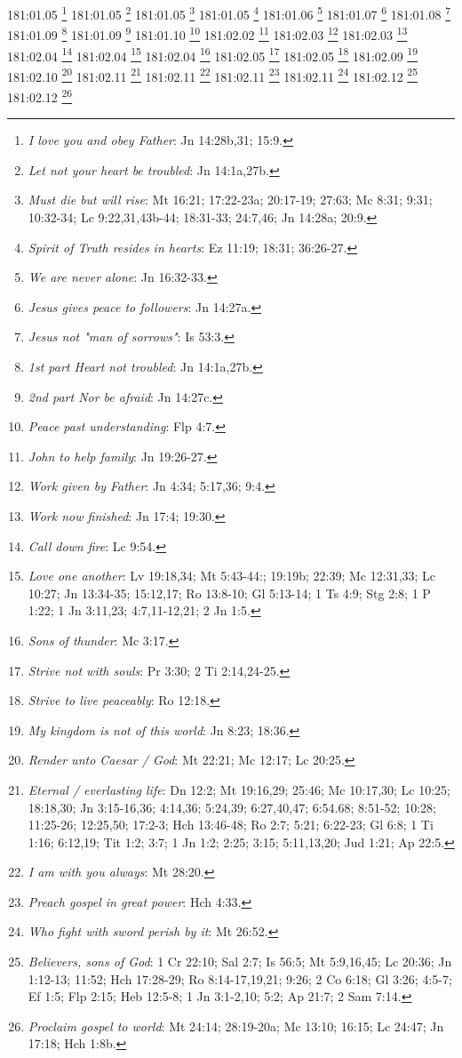 181:01.05 \footnote{\textit{I love you and obey Father}: Jn 14:28b,31; 15:9.}
181:01.05 \footnote{\textit{Let not your heart be troubled}: Jn 14:1a,27b.}
181:01.05 \footnote{\textit{Must die but will rise}: Mt 16:21; 17:22-23a; 20:17-19; 27:63; Mc 8:31; 9:31; 10:32-34; Lc 9:22,31,43b-44; 18:31-33; 24:7,46; Jn 14:28a; 20:9.}
181:01.05 \footnote{\textit{Spirit of Truth resides in hearts}: Ez 11:19; 18:31; 36:26-27.}
181:01.06 \footnote{\textit{We are never alone}: Jn 16:32-33.}
181:01.07 \footnote{\textit{Jesus gives peace to followers}: Jn 14:27a.}
181:01.08 \footnote{\textit{Jesus not "man of sorrows"}: Is 53:3.}
181:01.09 \footnote{\textit{1st part Heart not troubled}: Jn 14:1a,27b.}
181:01.09 \footnote{\textit{2nd part Nor be afraid}: Jn 14:27c.}
181:01.10 \footnote{\textit{Peace past understanding}: Flp 4:7.}
181:02.02 \footnote{\textit{John to help family}: Jn 19:26-27.}
181:02.03 \footnote{\textit{Work given by Father}: Jn 4:34; 5:17,36; 9:4.}
181:02.03 \footnote{\textit{Work now finished}: Jn 17:4; 19:30.}
181:02.04 \footnote{\textit{Call down fire}: Lc 9:54.}
181:02.04 \footnote{\textit{Love one another}: Lv 19:18,34; Mt 5:43-44:; 19:19b; 22:39; Mc 12:31,33; Lc 10:27; Jn 13:34-35; 15:12,17; Ro 13:8-10; Gl 5:13-14; 1 Ts 4:9; Stg 2:8; 1 P 1:22; 1 Jn 3:11,23; 4:7,11-12,21; 2 Jn 1:5.}
181:02.04 \footnote{\textit{Sons of thunder}: Mc 3:17.}
181:02.05 \footnote{\textit{Strive not with souls}: Pr 3:30; 2 Ti 2:14,24-25.}
181:02.05 \footnote{\textit{Strive to live peaceably}: Ro 12:18.}
181:02.09 \footnote{\textit{My kingdom is not of this world}: Jn 8:23; 18:36.}
181:02.10 \footnote{\textit{Render unto Caesar / God}: Mt 22:21; Mc 12:17; Lc 20:25.}
181:02.11 \footnote{\textit{Eternal / everlasting life}: Dn 12:2; Mt 19:16,29; 25:46; Mc 10:17,30; Lc 10:25; 18:18,30; Jn 3:15-16,36; 4:14,36; 5:24,39; 6:27,40,47; 6:54.68; 8:51-52; 10:28; 11:25-26; 12:25,50; 17:2-3; Hch 13:46-48; Ro 2:7; 5:21; 6:22-23; Gl 6:8; 1 Ti 1:16; 6:12,19; Tit 1:2; 3:7; 1 Jn 1:2; 2:25; 3:15; 5:11,13,20; Jud 1:21; Ap 22:5.}
181:02.11 \footnote{\textit{I am with you always}: Mt 28:20.}
181:02.11 \footnote{\textit{Preach gospel in great power}: Hch 4:33.}
181:02.11 \footnote{\textit{Who fight with sword perish by it}: Mt 26:52.}
181:02.12 \footnote{\textit{Believers, sons of God}: 1 Cr 22:10; Sal 2:7; Is 56:5; Mt 5:9,16,45; Lc 20:36; Jn 1:12-13; 11:52; Hch 17:28-29; Ro 8:14-17,19,21; 9:26; 2 Co 6:18; Gl 3:26; 4:5-7; Ef 1:5; Flp 2:15; Heb 12:5-8; 1 Jn 3:1-2,10; 5:2; Ap 21:7; 2 Sam 7:14.}
181:02.12 \footnote{\textit{Proclaim gospel to world}: Mt 24:14; 28:19-20a; Mc 13:10; 16:15; Lc 24:47; Jn 17:18; Hch 1:8b.}
